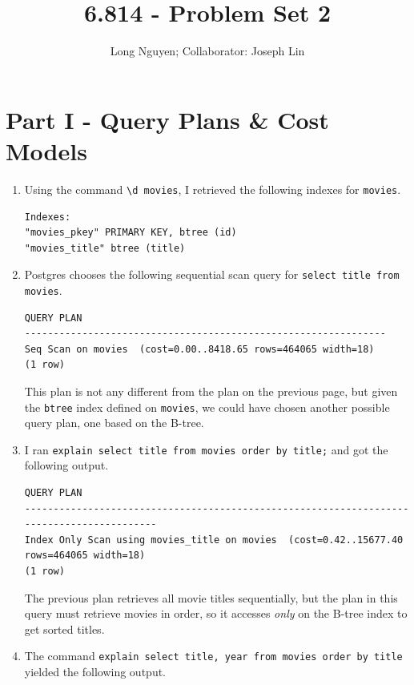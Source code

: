 \documentclass{article}
\author{Long Nguyen; Collaborator: Joseph Lin}
\title{6.814 - Problem Set 2}
\begin{document}
\maketitle

\small

\section*{Part I - Query Plans \& Cost Models}

\begin{enumerate}

\item Using the command \verb|\d movies|, I retrieved the following indexes for \verb|movies|.

\begin{Verbatim}
Indexes:
"movies_pkey" PRIMARY KEY, btree (id)
"movies_title" btree (title)
\end{Verbatim}

\item Postgres chooses the following sequential scan query for \verb|select title from movies|.

\begin{Verbatim}
QUERY PLAN
---------------------------------------------------------------
Seq Scan on movies  (cost=0.00..8418.65 rows=464065 width=18)
(1 row)
\end{Verbatim}

This plan is not any different from the plan on the previous page, but given the \verb|btree| index defined on \verb|movies|, we could have chosen another possible query plan, one based on the B-tree.

\item I ran \verb|explain select title from movies order by title;| and got the following output.

\begin{Verbatim}
QUERY PLAN
------------------------------------------------------------------------------------------
Index Only Scan using movies_title on movies  (cost=0.42..15677.40 rows=464065 width=18)
(1 row)
\end{Verbatim}

The previous plan retrieves all movie titles sequentially, but the plan in this query must retrieve movies in order, so it accesses \emph{only} on the B-tree index to get sorted titles.

\item The command \texttt{explain select title, year from movies order by
title} yielded the following output.


\end{enumerate}
\end{document}
